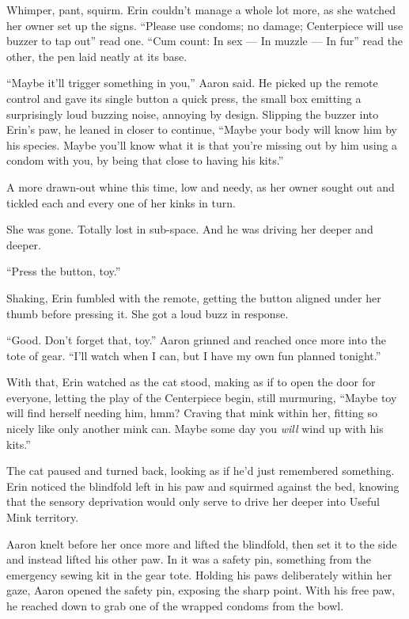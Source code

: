 Whimper, pant, squirm. Erin couldn't manage a whole lot more, as she watched her owner set up the signs. ``Please use condoms; no damage; Centerpiece will use buzzer to tap out'' read one. ``Cum count: In sex --- In muzzle --- In fur'' read the other, the pen laid neatly at its base.

``Maybe it'll trigger something in you,'' Aaron said. He picked up the remote control and gave its single button a quick press, the small box emitting a surprisingly loud buzzing noise, annoying by design. Slipping the buzzer into Erin's paw, he leaned in closer to continue, ``Maybe your body will know him by his species. Maybe you'll know what it is that you're missing out by him using a condom with you, by being that close to having his kits.''

A more drawn-out whine this time, low and needy, as her owner sought out and tickled each and every one of her kinks in turn.

She was gone. Totally lost in sub-space. And he was driving her deeper and deeper.

``Press the button, toy.''

Shaking, Erin fumbled with the remote, getting the button aligned under her thumb before pressing it. She got a loud buzz in response.

``Good. Don't forget that, toy.'' Aaron grinned and reached once more into the tote of gear. ``I'll watch when I can, but I have my own fun planned tonight.''

With that, Erin watched as the cat stood, making as if to open the door for everyone, letting the play of the Centerpiece begin, still murmuring, ``Maybe toy will find herself needing him, hmm? Craving that mink within her, fitting so nicely like only another mink can. Maybe some day you \emph{will} wind up with his kits.''

The cat paused and turned back, looking as if he'd just remembered something. Erin noticed the blindfold left in his paw and squirmed against the bed, knowing that the sensory deprivation would only serve to drive her deeper into Useful Mink territory.

Aaron knelt before her once more and lifted the blindfold, then set it to the side and instead lifted his other paw. In it was a safety pin, something from the emergency sewing kit in the gear tote. Holding his paws deliberately within her gaze, Aaron opened the safety pin, exposing the sharp point. With his free paw, he reached down to grab one of the wrapped condoms from the bowl.

